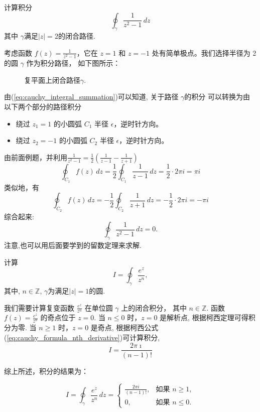 \begin{example}
    计算积分 
    $$ 
    \oint_{\gamma} \frac{1}{z^2 - 1} \, dz  
    $$
    其中 $\gamma$满足$|z| = 2$的闭合路径.
\end{example}
\begin{solution}
    考虑函数 \( f(z) = \frac{1}{z^2 - 1} \)，它在 \( z = 1 \) 和 \( z = -1 \) 处有简单极点。我们选择半径为 2 的圆 \( \gamma \) 作为积分路径，
    如下图所示：
    
    \begin{figure}
    \centering
        \scalebox{0.7}{
   
    }
    \caption{复平面上闭合路径$\gamma$.}
    \end{figure}
    由(\ref{eq:cauchy_integral_summation})可以知道,
    关于路径 \( \gamma \)的积分
    可以转换为由以下两个部分的路径积分
    \begin{itemize}
        \item 绕过 \( z_1 = 1 \) 的小圆弧 \( C_1 \) 半径 \( \epsilon \)，逆时针方向。
        \item 绕过 \( z_2 = -1 \) 的小圆弧 \( C_2 \) 半径 \( \epsilon \)，逆时针方向。
    \end{itemize}
    由前面例题，并利用$\frac{1}{z^2 -1} = \frac{1}{2}\left( \frac{1}{z-1} - \frac{1}{z+1}\right)$
    \[
    \oint_{C_1} f(z) \, dz =\frac{1}{2}\oint_{C_1} \frac{1}{z-1} \, dz =  \frac{1}{2} \cdot 2\pi i  = \pi i
    \]
    类似地，有
    \[
        \oint_{C_2} f(z) \, dz =-\frac{1}{2}\oint_{C_2} \frac{1}{z+1} \, dz =  -\frac{1}{2} \cdot 2\pi i  = -\pi i
    \]
    综合起来:
    \[
        \oint_{\gamma} \frac{1}{z^2 - 1} \, dz = 0.
    \]
    注意,也可以用后面要学到的留数定理来求解.
\end{solution}

\begin{example}
    计算 
    $$
    I = \oint_\gamma \frac{e^z}{z^n}, 
    $$
    其中, $n\in \mathbb{Z}$, $\gamma$为满足$|z| = 1$的圆.
\end{example}
\begin{solution}
    我们需要计算复变函数 \( \frac{e^z}{z^n} \) 在单位圆 \( \gamma \) 上的闭合积分，
    其中 \( n \in \mathbb{Z} \).
函数 \( f(z) = \frac{e^z}{z^n} \) 的奇点位于 \( z = 0 \).
当 \( n \leq 0 \) 时，\( z = 0 \) 是解析点, 根据柯西定理可得积分为零.
当 \( n \geq 1 \) 时，\( z = 0 \) 是奇点, 根据柯西公式(\ref{eq:cauchy_formula_nth_derivative})可计算积分,
$$ I = \frac{2 \pi \imath }{(n-1)!}$$

综上所述，积分的结果为：

\[
I = \oint_\gamma \frac{e^z}{z^n} \, dz =
\begin{cases}
\frac{2\pi i}{(n-1)!}, & \text{如果 } n \geq 1, \\
0, & \text{如果 } n \leq 0.
\end{cases}
\]

\end{solution}


